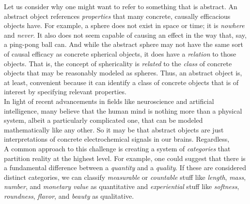 Let us consider why one might want to refer to something that is abstract. An abstract object references \textit{properties} that many concrete, causally efficacious objects have. For example, a sphere does not exist in space or time; it is \textit{nowhere} and \textit{never}. It also does not seem capable of causing an effect in the way that, say, a ping-pong ball can. And while the abstract sphere may not have the same sort of causal efficacy as concrete spherical objects, it does have a \textit{relation} to those objects. That is, the concept of sphericality is \textit{related} to the \textit{class} of concrete objects that may be reasonably modeled as spheres. Thus, an abstract object is, at least, convenient because it can identify a class of concrete objects that is of interest by specifying relevant properties. \\

In light of recent advancements in fields like neuroscience and artificial intelligence, many believe that the human mind is nothing more than a physical system, albeit a particularly complicated one, that can be modeled mathematically like any other. So it may be that abstract objects are just interpretations of concrete electrochemical signals in our brains. Regardless,  \\







A common approach to this challenge is creating a system of \textit{categories} that partition reality at the highest level. For example, one could suggest that there is a fundamental difference between a \textit{quantity} and a \textit{quality}. If these are considered distinct categories, we can classify \textit{measurable} or \textit{countable} stuff like \textit{length}, \textit{mass}, \textit{number}, and \textit{monetary value} as quantitative and \textit{experiential} stuff like \textit{softness}, \textit{roundness}, \textit{flavor}, and \textit{beauty} as qualitative. \\

